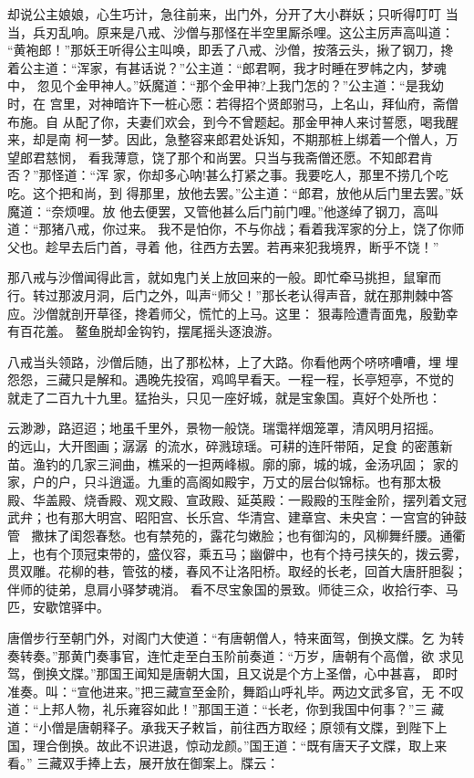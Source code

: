 却说公主娘娘，心生巧计，急往前来，出门外，分开了大小群妖；只听得叮叮
当当，兵刃乱响。原来是八戒、沙僧与那怪在半空里厮杀哩。这公主厉声高叫道：
“黄袍郎！”那妖王听得公主叫唤，即丢了八戒、沙僧，按落云头，揪了钢刀，搀
着公主道：“浑家，有甚话说？”公主道：“郎君啊，我才时睡在罗帏之内，梦魂中，
忽见个金甲神人。”妖魔道：“那个金甲神?上我门怎的？”公主道：“是我幼时，在
宫里，对神暗许下一桩心愿：若得招个贤郎驸马，上名山，拜仙府，斋僧布施。自
从配了你，夫妻们欢会，到今不曾题起。那金甲神人来讨誓愿，喝我醒来，却是南
柯一梦。因此，急整容来郎君处诉知，不期那桩上绑着一个僧人，万望郎君慈悯，
看我薄意，饶了那个和尚罢。只当与我斋僧还愿。不知郎君肯否？”那怪道：“浑
家，你却多心呐!甚么打紧之事。我要吃人，那里不捞几个吃吃。这个把和尚，到
得那里，放他去罢。”公主道：“郎君，放他从后门里去罢。”妖魔道：“奈烦哩。放
他去便罢，又管他甚么后门前门哩。”他遂绰了钢刀，高叫道：“那猪八戒，你过来。
我不是怕你，不与你战；看着我浑家的分上，饶了你师父也。趁早去后门首，寻着
他，往西方去罢。若再来犯我境界，断乎不饶！”

那八戒与沙僧闻得此言，就如鬼门关上放回来的一般。即忙牵马挑担，鼠窜而
行。转过那波月洞，后门之外，叫声“师父！”那长老认得声音，就在那荆棘中答
应。沙僧就剖开草径，搀着师父，慌忙的上马。这里：
狠毒险遭青面鬼，殷勤幸有百花羞。
鳌鱼脱却金钩钓，摆尾摇头逐浪游。

八戒当头领路，沙僧后随，出了那松林，上了大路。你看他两个哜哜嘈嘈，埋
埋怨怨，三藏只是解和。遇晚先投宿，鸡鸣早看天。一程一程，长亭短亭，不觉的
就走了二百九十九里。猛抬头，只见一座好城，就是宝象国。真好个处所也：

云渺渺，路迢迢；地虽千里外，景物一般饶。瑞霭祥烟笼罩，清风明月招摇。
的远山，大开图画；潺潺的流水，碎溅琼瑶。可耕的连阡带陌，足食
的密蕙新苗。渔钓的几家三涧曲，樵采的一担两峰椒。廓的廓，城的城，金汤巩固；
家的家，户的户，只斗逍遥。九重的高阁如殿宇，万丈的层台似锦标。也有那太极
殿、华盖殿、烧香殿、观文殿、宣政殿、延英殿：一殿殿的玉陛金阶，摆列着文冠
武弁；也有那大明宫、昭阳宫、长乐宫、华清宫、建章宫、未央宫：一宫宫的钟鼓
管
，撒抹了闺怨春愁。也有禁苑的，露花匀嫩脸；也有御沟的，风柳舞纤腰。通衢
上，也有个顶冠束带的，盛仪容，乘五马；幽僻中，也有个持弓挟矢的，拨云雾，
贯双雕。花柳的巷，管弦的楼，春风不让洛阳桥。取经的长老，回首大唐肝胆裂；
伴师的徒弟，息肩小驿梦魂消。
看不尽宝象国的景致。师徒三众，收拾行李、马匹，安歇馆驿中。

唐僧步行至朝门外，对阁门大使道：“有唐朝僧人，特来面驾，倒换文牒。乞
为转奏转奏。”那黄门奏事官，连忙走至白玉阶前奏道：“万岁，唐朝有个高僧，欲
求见驾，倒换文牒。”那国王闻知是唐朝大国，且又说是个方上圣僧，心中甚喜，
即时准奏。叫：“宣他进来。”把三藏宣至金阶，舞蹈山呼礼毕。两边文武多官，无
不叹道：“上邦人物，礼乐雍容如此！”那国王道：“长老，你到我国中何事？”三
藏道：“小僧是唐朝释子。承我天子敕旨，前往西方取经；原领有文牒，到陛下上
国，理合倒换。故此不识进退，惊动龙颜。”国王道：“既有唐天子文牒，取上来看。”
三藏双手捧上去，展开放在御案上。牒云：

